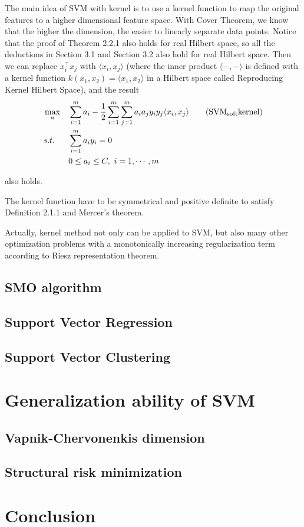 \documentclass[a4paper]{report}
\begin{document}
The main idea of SVM with kernel is to use a kernel function to map the original features to a higher dimensional feature space. With Cover Theorem, we know that the higher the dimension, the easier to linearly separate data points. Notice that the proof of Theorem 2.2.1 also holds for real Hilbert space, so all the deductions in Section 3.1 and Section 3.2 also hold for real Hilbert space. Then we can replace $x_i^\top x_j$ with $\langle x_i,x_j \rangle$ (where the inner product $\langle -,-
    \rangle$ is defined with a kernel function $k(x_1,x_2)=\langle x_1,x_2\rangle$ in a Hilbert space called Reproducing Kernel Hilbert Space), and the result 
\begin{align*}
    &\max_a & & \sum_{i=1}^m a_i - \frac{1}{2} \sum_{i=1}^m\sum_{j=1}^m a_i a_j y_i y_j \langle x_i, x_j\rangle \label{softsvmk}\tag{$\mathrm{SVM_{soft} kernel}$}\\
    &s.t. \ & & \sum_{i=1}^m a_i y_i=0 \\
    & & & 0\leq a_i \leq C,\ i=1,\cdots,m 
\end{align*}

also holds. 

The kernel function have to be symmetrical and positive definite to satisfy Definition 2.1.1 and Mercer's theorem.

Actually, kernel method not only can be applied to SVM, but also many other optimization problems with a monotonically increasing regularization term according to Riesz representation theorem.
\section{SMO algorithm}

\section{Support Vector Regression}
\section{Support Vector Clustering}
\chapter{Generalization ability of SVM}
\section{Vapnik-Chervonenkis dimension}
\section{Structural risk minimization}
\chapter{Conclusion}

{}

\end{document}
